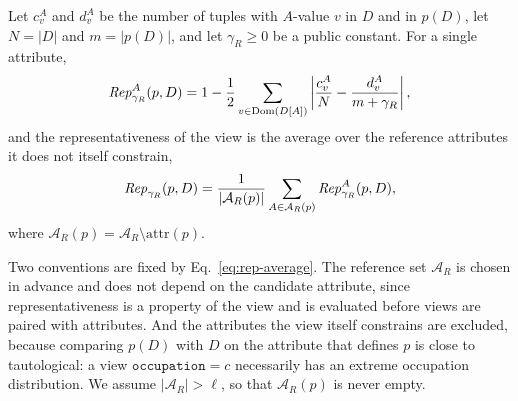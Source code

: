 \begin{definition}
\label{def:rep}
Let $c^A_v$ and $d^A_v$ be the number of tuples with $A$-value $v$ in $D$ and in $p(D)$, let $N=|D|$ and $m=|p(D)|$, and let $\gamma_R\ge0$ be a public constant.
For a single attribute,
\begin{equation}
\mathit{Rep}^A_{\gamma_R}(p,D)=1-\frac{1}{2}\sum_{v\in\operatorname{Dom}(D[A])}\left|\frac{c^A_v}{N}-\frac{d^A_v}{m+\gamma_R}\right| ,
\label{eq:representativeness-proxy}
\end{equation}
and the representativeness of the view is the average over the reference attributes it does not itself constrain,
\begin{equation}
\mathit{Rep}_{\gamma_R}(p,D)=\frac{1}{|\mathcal{A}_R(p)|}\sum_{A\in\mathcal{A}_R(p)}\mathit{Rep}^A_{\gamma_R}(p,D),
\label{eq:rep-average}
\end{equation}
where $\mathcal{A}_R(p)=\mathcal{A}_R\setminus\mathrm{attr}(p)$.
\end{definition}

Two conventions are fixed by Eq.~\eqref{eq:rep-average}.
The reference set $\mathcal{A}_R$ is chosen in advance and does not depend on the candidate attribute, since representativeness is a property of the view and is evaluated before views are paired with attributes.
And the attributes the view itself constrains are excluded, because comparing $p(D)$ with $D$ on the attribute that defines $p$ is close to tautological: a view $\texttt{occupation}=c$ necessarily has an extreme occupation distribution.
We assume $|\mathcal{A}_R|>\ell$, so that $\mathcal{A}_R(p)$ is never empty.

